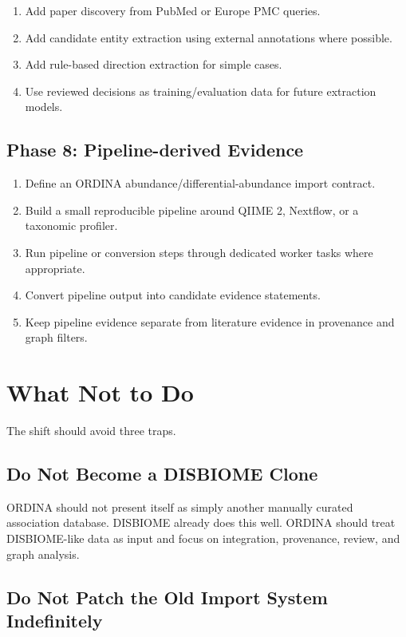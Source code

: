 \documentclass[11pt,a4paper]{article}
\begin{document}
\begin{enumerate}[noitemsep]
    \item Add paper discovery from PubMed or Europe PMC queries.
    \item Add candidate entity extraction using external annotations where possible.
    \item Add rule-based direction extraction for simple cases.
    \item Use reviewed decisions as training/evaluation data for future extraction models.
\end{enumerate}

\subsection{Phase 8: Pipeline-derived Evidence}

\begin{enumerate}[noitemsep]
    \item Define an ORDINA abundance/differential-abundance import contract.
    \item Build a small reproducible pipeline around QIIME 2, Nextflow, or a taxonomic profiler.
    \item Run pipeline or conversion steps through dedicated worker tasks where appropriate.
    \item Convert pipeline output into candidate evidence statements.
    \item Keep pipeline evidence separate from literature evidence in provenance and graph filters.
\end{enumerate}

\section{What Not to Do}

The shift should avoid three traps.

\subsection{Do Not Become a DISBIOME Clone}

ORDINA should not present itself as simply another manually curated association database. DISBIOME already does this well. ORDINA should treat DISBIOME-like data as input and focus on integration, provenance, review, and graph analysis.

\subsection{Do Not Patch the Old Import System Indefinitely}
\end{document}
